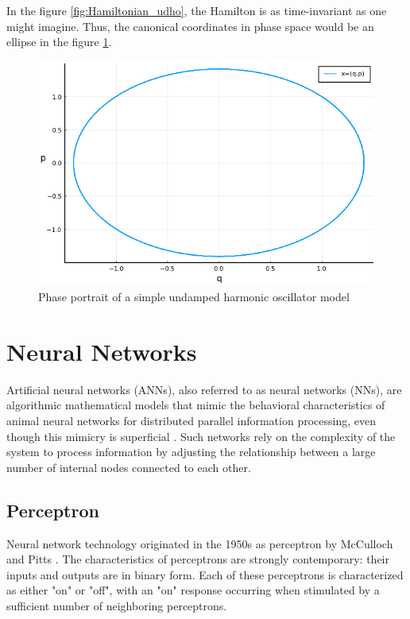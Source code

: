 \documentclass[
	parskip, 			   %
	twoside, 			   %
	DIV=14, 			   %
	BCOR=15.0mm, 		   %
	headsepline, 		   %
	open=right, 		   %
	captions=tableheading, %
	bibliography=totoc,    %
	numbers=noenddot       %
]{scrreprt}
\begin{document}
In the figure \ref{fig:Hamiltonian_udho}, the Hamilton is as time-invariant as one might imagine. Thus, the canonical coordinates in phase space would be an ellipse in the figure \ref{fig:phase_portrait_udho}.

\begin{figure}[h!]
    \centering
    \includegraphics[scale=0.8]{figures/phase_portrait_canonical_coordinates.png}
    \caption{Phase portrait of a simple undamped harmonic oscillator model}
    \label{fig:phase_portrait_udho}
\end{figure}


\clearpage
\chapter{Neural Networks}
\label{ch:chapter4}
Artificial neural networks (ANNs), also referred to as neural networks (NNs), are algorithmic mathematical models that mimic the behavioral characteristics of animal neural networks for distributed parallel information processing, even though this mimicry is superficial \cite{russell2010artificial}. Such networks rely on the complexity of the system to process information by adjusting the relationship between a large number of internal nodes connected to each other.

\section{Perceptron}
Neural network technology originated in the 1950s as perceptron by McCulloch and Pitts \cite{mcculloch1943logical}. The characteristics of perceptrons are strongly contemporary: their inputs and outputs are in binary form. Each of these perceptrons is characterized as either "on" or "off", with an "on" response occurring when stimulated by a sufficient number of neighboring perceptrons.
\end{document}
